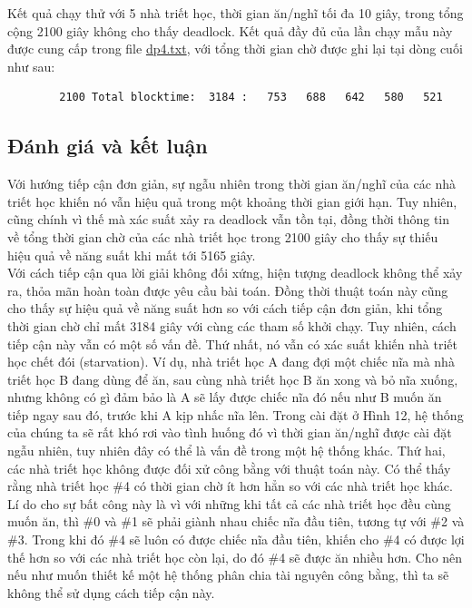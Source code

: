 \documentclass{article}
\begin{document}
Kết quả chạy thử với 5 nhà triết học, thời gian ăn/nghĩ tối đa 10 giây, trong tổng cộng 2100 giây
không cho thấy deadlock. Kết quả đầy đủ của lần chạy mẫu này được cung cấp trong file \href{https://github.com/dont-penciler/INT2214/blob/main/a2/written/dp2.txt}{dp4.txt},
với tổng thời gian chờ được ghi lại tại dòng cuối như sau:
\begin{verbatim}
        2100 Total blocktime:  3184 :   753   688   642   580   521
\end{verbatim}
\subsection{Đánh giá và kết luận}
Với hướng tiếp cận đơn giản, sự ngẫu nhiên trong thời gian ăn/nghĩ của các nhà triết học khiến nó
vẫn hiệu quả trong một khoảng thời gian giới hạn. Tuy nhiên, cũng chính vì thế mà xác suất xảy ra deadlock
vẫn tồn tại, đồng thời thông tin về tổng thời gian chờ của các nhà triết học trong 2100 giây cho thấy sự
thiếu hiệu quả về năng suất khi mất tới 5165 giây. \\

Với cách tiếp cận qua lời giải không đối xứng, hiện tượng deadlock không thể xảy ra, thỏa mãn hoàn toàn được yêu cầu
bài toán. Đồng thời thuật toán này cũng cho thấy sự hiệu quả về năng suất hơn so với cách tiếp cận đơn giản,
khi tổng thời gian chờ chỉ mất 3184 giây với cùng các tham số khởi chạy.
Tuy nhiên, cách tiếp cận này vẫn có một số vấn đề. Thứ nhất, nó vẫn có xác suất khiến nhà triết học
chết đói (starvation). Ví dụ, nhà triết học A đang đợi một chiếc nĩa mà nhà triết học B đang dùng để ăn, sau cùng
nhà triết học B ăn xong và bỏ nĩa xuống, nhưng không có gì đảm bảo là A sẽ lấy được chiếc nĩa đó nếu như B muốn ăn
tiếp ngay sau đó, trước khi A kịp nhấc nĩa lên. Trong cài đặt ở Hình 12, hệ thống của chúng ta sẽ rất khó
rơi vào tình huống đó vì thời gian ăn/nghĩ được cài đặt ngẫu nhiên, tuy nhiên đây có thể là vấn đề
trong một hệ thống khác. Thứ hai, các nhà triết học không được đối xử công bằng với thuật toán này. Có thể
thấy rằng nhà triết học \#4 có thời gian chờ ít hơn hẳn so với các nhà triết học khác. Lí do cho sự bất công
này là vì với những khi tất cả các nhà triết học đều cùng muốn ăn, thì \#0 và \#1 sẽ phải giành nhau chiếc nĩa đầu tiên,
tương tự với \#2 và \#3. Trong khi đó \#4 sẽ luôn có được chiếc nĩa đầu tiên, khiến cho \#4 có được lợi thế hơn
so với các nhà triết học còn lại, do đó \#4 sẽ được ăn nhiều hơn. Cho nên nếu như muốn thiết kế một hệ thống
phân chia tài nguyên công bằng, thì ta sẽ không thể sử dụng cách tiếp cận này. \\
\end{document}

